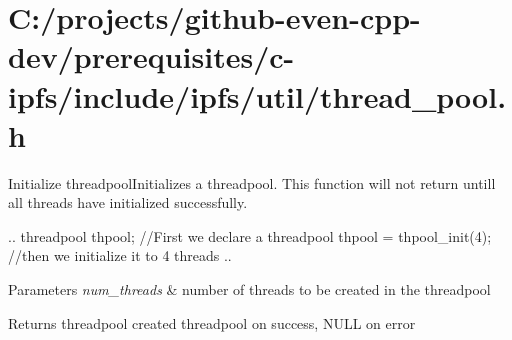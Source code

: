 \hypertarget{_c_1_2projects_2github-even-cpp-dev_2prerequisites_2c-ipfs_2include_2ipfs_2util_2thread_pool_8h-example}{}\section{C\+:/projects/github-\/even-\/cpp-\/dev/prerequisites/c-\/ipfs/include/ipfs/util/thread\+\_\+pool.\+h}
Initialize threadpool\+Initializes a threadpool. This function will not return untill all threads have initialized successfully.

.. threadpool thpool; //\+First we declare a threadpool thpool = thpool\+\_\+init(4); //then we initialize it to 4 threads ..


\begin{DoxyParams}{Parameters}
{\em num\+\_\+threads} & number of threads to be created in the threadpool \\
\hline
\end{DoxyParams}
\begin{DoxyReturn}{Returns}
threadpool created threadpool on success, N\+U\+LL on error
\end{DoxyReturn}

